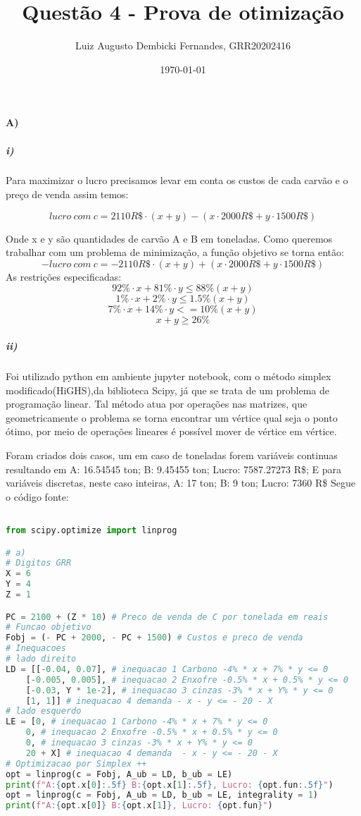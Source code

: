 \documentclass[]{article} %
\begin{document}
\title{Questão 4 - Prova de otimização}
\author{Luiz Augusto Dembicki Fernandes, GRR20202416}
\date{\today}
\maketitle

\paragraph{A)}

\subparagraph{i)}
Para maximizar o lucro precisamos levar em conta os custos de cada carvão e o preço de venda assim temos:

\[ lucro \ com \ c = 2110  R\$ \cdot (x + y)  - (x \cdot 2000  R\$ + y \cdot 1500 R\$ ) \]

Onde x e y são quantidades de carvão A e B em toneladas.
Como queremos trabalhar com um problema de minimização, a função objetivo se torna então:
\[  - lucro \ com \ c = - 2110  R\$ \cdot (x + y)  + (x \cdot 2000  R\$ + y \cdot 1500 R\$ )  \]
As restrições especificadas:
\[ 92 \% \cdot x + 81 \% \cdot y \leqslant  88 \% (x + y) \]
\[ 1 \% \cdot x + 2 \% \cdot y \leqslant 1.5 \% (x + y) \]
\[ 7 \% \cdot x +  14 \% \cdot y <=  10 \% (x + y) \]
\[ x + y \geqslant 26 \%  \]

\subparagraph{ii)}

Foi utilizado python em ambiente jupyter notebook, com o método simplex modificado(HiGHS),da biblioteca Scipy, já que se trata de um problema de programação linear.
Tal método atua por operações nas matrizes, que geometricamente o problema se torna encontrar um vértice qual seja o ponto ótimo, por meio de operações
lineares é possível mover de vértice em vértice.

Foram criados dois casos, um em caso de toneladas forem variáveis continuas resultando em A: 16.54545 ton; B: 9.45455 ton; Lucro: 7587.27273 R\$;
E para variáveis discretas, neste caso inteiras, A: 17 ton; B: 9 ton; Lucro: 7360 R\$
Segue o código fonte:
\begin{lstlisting}[language=Python, basicstyle=\small]

from scipy.optimize import linprog

# a) 
# Digitos GRR
X = 6
Y = 4
Z = 1

PC = 2100 + (Z * 10) # Preco de venda de C por tonelada em reais
# Funcao objetivo
Fobj = (- PC + 2000, - PC + 1500) # Custos e preco de venda
# Inequacoes
# lado direito
LD = [[-0.04, 0.07], # inequacao 1 Carbono -4% * x + 7% * y <= 0 
    [-0.005, 0.005], # inequacao 2 Enxofre -0.5% * x + 0.5% * y <= 0
    [-0.03, Y * 1e-2], # inequacao 3 cinzas -3% * x + Y% * y <= 0
    [1, 1]] # inequacao 4 demanda - x - y <= - 20 - X  
# lado esquerdo
LE = [0, # inequacao 1 Carbono -4% * x + 7% * y <= 0 
    0, # inequacao 2 Enxofre -0.5% * x + 0.5% * y <= 0 
    0, # inequacao 3 cinzas -3% * x + Y% * y <= 0
    20 + X] # inequacao 4 demanda  - x - y <= - 20 - X
# Optimizacao por Simplex ++ 
opt = linprog(c = Fobj, A_ub = LD, b_ub = LE)
print(f"A:{opt.x[0]:.5f} B:{opt.x[1]:.5f}, Lucro: {opt.fun:.5f}")
opt = linprog(c = Fobj, A_ub = LD, b_ub = LE, integrality = 1)
print(f"A:{opt.x[0]} B:{opt.x[1]}, Lucro: {opt.fun}")
\end{lstlisting}
\end{document}
